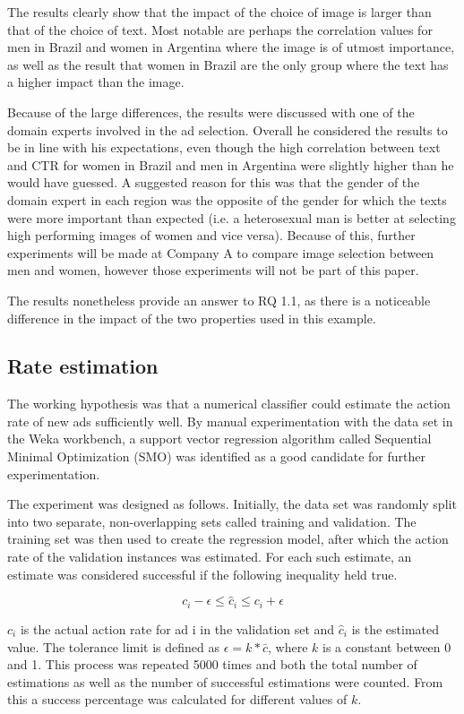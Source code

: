 \documentclass{sig-alternate}
\begin{document}
The results clearly show that the impact of the choice of image is larger than that of the choice of text. Most notable are perhaps the correlation values for men in Brazil and women in Argentina where the image is of utmost importance, as well as the result that women in Brazil are the only group where the text has a higher impact than the image.

Because of the large differences, the results were discussed with one of the domain experts involved in the ad selection. Overall he considered the results to be in line with his expectations, even though the high correlation between text and CTR for women in Brazil and men in Argentina were slightly higher than he would have guessed. A suggested reason for this was that the gender of the domain expert in each region was the opposite of the gender for which the texts were more important than expected (i.e. a heterosexual man is better at selecting high performing images of women and vice versa). Because of this, further experiments will be made at Company A to compare image selection between men and women, however those experiments will not be part of this paper.

The results nonetheless provide an answer to RQ 1.1, as there is a noticeable difference in the impact of the two properties used in this example.

\subsection{Rate estimation}
The working hypothesis was that a numerical classifier could estimate the action rate of new ads sufficiently well. By manual experimentation with the data set in the Weka workbench, a support vector regression algorithm called Sequential Minimal Optimization (SMO) was identified as a good candidate for further experimentation.

The experiment was designed as follows. Initially, the data set was randomly split into two separate, non-overlapping sets called training and validation. The training set was then used to create the regression model, after which the action rate of the validation instances was estimated. For each such estimate, an estimate was considered successful if the following inequality held true.

\[
	c_i - \epsilon \leq \hat{c}_i \leq c_i + \epsilon
\]

\(c_i\) is the actual action rate for ad i in the validation set and \(\hat{c}_i\) is the estimated value. The tolerance limit is defined as \(\epsilon = k*\bar{c}\), where \(k\) is a constant between 0 and 1. This process was repeated 5000 times and both the total number of estimations as well as the number of successful estimations were counted. From this a success percentage was calculated for different values of \(k\).
\end{document}
